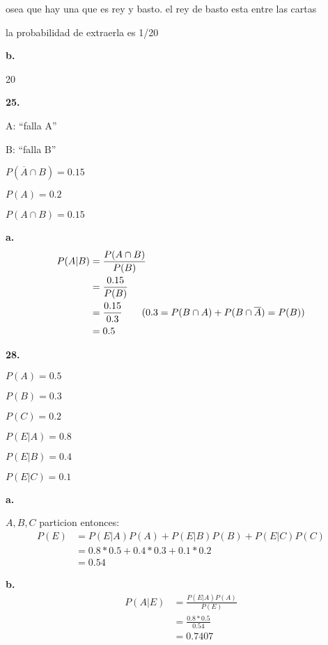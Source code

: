 \documentclass[12pt]{article}
\begin{document}
osea que hay una que es rey y basto. el rey de basto esta entre las cartas

la probabilidad de extraerla es 1/20

\textbf{b.}

20

\textbf{25.}

A: ``falla A''

B: ``falla B''

$P(\overline{A} \cap B)=0.15$

$P(A)=0.2$

$P(A \cap B)=0.15$

\textbf{a.}
\begin{align*}
  P(A|B)&=\frac{P(A \cap B)}{P(B)}\\
        &=\frac{0.15}{P(B)}\\
        &=\frac{0.15}{0.3}\tag{$0.3=P(B \cap A)+P(B \cap \overline{A})=P(B)$}\\
        &=0.5
\end{align*}

\textbf{28.}

$P(A)=0.5$

$P(B)=0.3$

$P(C)=0.2$

$P(E|A)=0.8$

$P(E|B)=0.4$

$P(E|C)=0.1$

\textbf{a.}

$A,B,C$ particion entonces:
\begin{align*}
  P(E)&=P(E|A)P(A)+P(E|B)P(B)+P(E|C)P(C)\\
      &=0.8*0.5+0.4*0.3+0.1*0.2\\
      &=0.54
\end{align*}

\textbf{b.}
\begin{align*}
  P(A|E)&=\frac{P(E|A)P(A)}{P(E)}\\
        &=\frac{0.8*0.5}{0.54}\\
        &=0.7407
\end{align*}
\end{document}
